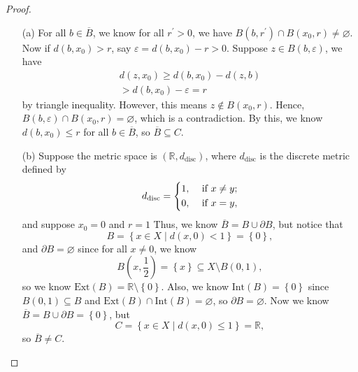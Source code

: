 \begin{proof}
  \vphantom{text}
  \begin{itemize}
    \item [(a)] For all \(b \in \overline{B} \), we know for all \(r^{\prime} > 0\), we have \(B(b, r^{\prime} ) \cap B(x_0, r) \neq \varnothing \). Now if \(d(b, x_0) >r\), say \(\varepsilon = d(b, x_0) - r > 0\). Suppose \(z \in B(b, \varepsilon )\), we have 
    \begin{align*}
      d(z, x_0) \ge d(b, x_0) - d(z, b) \\
                > d(b, x_0) - \varepsilon = r
    \end{align*}      
    by triangle inequality. However, this means \(z \notin B(x_0, r)\). Hence, \(B(b, \varepsilon ) \cap B(x_0, r) = \varnothing \), which is a contradiction. By this, we know \(d(b, x_0) \le r\) for all \(b \in \overline{B} \), so \(\overline{B} \subseteq C \).     
    \item [(b)] Suppose the metric space is \((\mathbb{R} , d_{\mathrm{disc} } )\), where \(d_{\mathrm{disc} }\) is the discrete metric defined by 
    \[
      d_{\mathrm{disc} } = \begin{dcases}
        1, &\text{ if } x \neq y ;\\
        0, &\text{ if } x = y,
      \end{dcases}
    \]
      and suppose \(x_0 = 0\) and \(r = 1\) Thus, we know \(\overline{B} = B \cup \partial B\), but notice that 
      \[
        B = \left\{ x \in X \mid d(x, 0) < 1 \right\} = \left\{ 0 \right\},  
      \]  and \(\partial B = \varnothing \) since for all \(x \neq 0\), we know 
      \[
        B\left( x, \frac{1}{2} \right)  = \left\{ x \right\} \subseteq X \setminus B(0, 1), 
      \] so we know \(\mathrm{Ext}(B) = \mathbb{R} \setminus \left\{ 0 \right\}  \). Also, we know \(\mathrm{Int}(B) = \left\{ 0 \right\}\) since \(B(0, 1) \subseteq B\) and \(\mathrm{Ext}(B) \cap \mathrm{Int}(B) = \varnothing\), so \(\partial B = \varnothing \). Now we know \(\overline{B} = B \cup \partial B = \left\{ 0 \right\}  \), but 
      \[
        C = \left\{ x \in X \mid d(x, 0) \le 1 \right\} = \mathbb{R},
      \] so \(\overline{B} \neq C \). 
  \end{itemize}
\end{proof}
